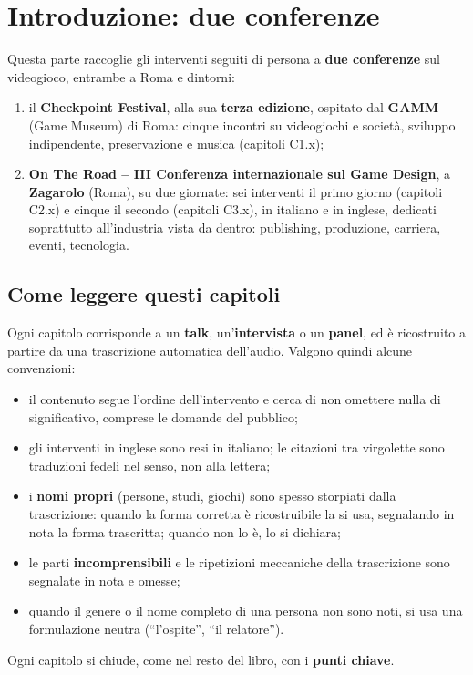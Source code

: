 
\chapter*{Introduzione: due conferenze}
{}

Questa parte raccoglie gli interventi seguiti di persona a \textbf{due
conferenze} sul videogioco, entrambe a Roma e dintorni:
\begin{enumerate}
  \item il \textbf{Checkpoint Festival}, alla sua \textbf{terza edizione}, ospitato
        dal \textbf{GAMM} (Game Museum) di Roma: cinque incontri su videogiochi e
        società, sviluppo indipendente, preservazione e musica (capitoli C1.x);
  \item \textbf{On The Road -- III Conferenza internazionale sul Game Design}, a
        \textbf{Zagarolo} (Roma), su due giornate: sei interventi il primo giorno
        (capitoli C2.x) e cinque il secondo (capitoli C3.x), in italiano e in
        inglese, dedicati soprattutto all'industria vista da dentro: publishing,
        produzione, carriera, eventi, tecnologia.
\end{enumerate}

\section*{Come leggere questi capitoli}

Ogni capitolo corrisponde a un \textbf{talk}, un'\textbf{intervista} o un
\textbf{panel}, ed è ricostruito a partire da una trascrizione automatica
dell'audio. Valgono quindi alcune convenzioni:
\begin{itemize}
  \item il contenuto segue l'ordine dell'intervento e cerca di non omettere nulla di
        significativo, comprese le domande del pubblico;
  \item gli interventi in inglese sono resi in italiano; le citazioni tra virgolette
        sono traduzioni fedeli nel senso, non alla lettera;
  \item i \textbf{nomi propri} (persone, studi, giochi) sono spesso storpiati dalla
        trascrizione: quando la forma corretta è ricostruibile la si usa,
        segnalando in nota la forma trascritta; quando non lo è, lo si dichiara;
  \item le parti \textbf{incomprensibili} e le ripetizioni meccaniche della
        trascrizione sono segnalate in nota e omesse;
  \item quando il genere o il nome completo di una persona non sono noti, si usa
        una formulazione neutra (``l'ospite'', ``il relatore'').
\end{itemize}
Ogni capitolo si chiude, come nel resto del libro, con i \textbf{punti chiave}.
